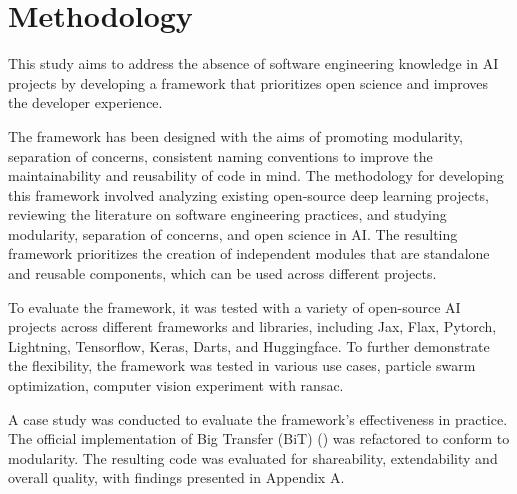


\section{Methodology}

This study aims to address the absence of software engineering knowledge in AI projects by developing a framework that prioritizes open science and improves the developer experience. 


The framework has been designed with the aims of promoting modularity, separation of concerns, consistent naming conventions to improve the maintainability and reusability of code in mind. The methodology for developing this framework involved analyzing existing open-source deep learning projects, reviewing the literature on software engineering practices, and studying modularity, separation of concerns, and open science in AI. The resulting framework prioritizes the creation of independent modules that are standalone and reusable components, which can be used across different projects.



To evaluate the framework, it was tested with a variety of open-source AI projects across different frameworks and libraries, including Jax, Flax, Pytorch, Lightning, Tensorflow, Keras, Darts, and Huggingface. To further demonstrate the flexibility, the framework was tested in various use cases, particle swarm optimization, computer vision experiment with ransac.

A case study was conducted to evaluate the framework's effectiveness in practice. The official implementation of Big Transfer (BiT)  (\cite{transferlearning}) was refactored to conform to modularity. The resulting code was evaluated for shareability, extendability and overall quality, with findings presented in Appendix A.

